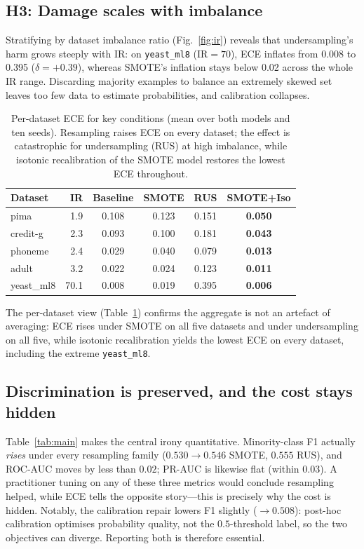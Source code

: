 \documentclass[conference]{IEEEtran}
\begin{document}
\subsection{H3: Damage scales with imbalance}
Stratifying by dataset imbalance ratio (Fig.~\ref{fig:ir}) reveals that
undersampling's harm grows steeply with IR: on \texttt{yeast\_ml8}
(IR$=70$), ECE inflates from 0.008 to 0.395 ($\delta=+0.39$), whereas
SMOTE's inflation stays below 0.02 across the whole IR range. Discarding
majority examples to balance an extremely skewed set leaves too few data
to estimate probabilities, and calibration collapses.

\begin{table}[t]
\caption{Per-dataset ECE for key conditions (mean over both models and
ten seeds). Resampling raises ECE on every dataset; the effect is
catastrophic for undersampling (RUS) at high imbalance, while isotonic
recalibration of the SMOTE model restores the lowest ECE throughout.}
\label{tab:perdata}
\centering
\begin{tabular}{lrcccc}
\toprule
Dataset & IR & Baseline & SMOTE & RUS & SMOTE+Iso \\
\midrule
pima & 1.9 & 0.108 & 0.123 & 0.151 & \textbf{0.050} \\
credit-g & 2.3 & 0.093 & 0.100 & 0.181 & \textbf{0.043} \\
phoneme & 2.4 & 0.029 & 0.040 & 0.079 & \textbf{0.013} \\
adult & 3.2 & 0.022 & 0.024 & 0.123 & \textbf{0.011} \\
yeast\_ml8 & 70.1 & 0.008 & 0.019 & 0.395 & \textbf{0.006} \\
\bottomrule
\end{tabular}
\end{table}

The per-dataset view (Table~\ref{tab:perdata}) confirms the aggregate is
not an artefact of averaging: ECE rises under SMOTE on all five datasets
and under undersampling on all five, while isotonic recalibration yields
the lowest ECE on every dataset, including the extreme
\texttt{yeast\_ml8}.

\subsection{Discrimination is preserved, and the cost stays hidden}
Table~\ref{tab:main} makes the central irony quantitative. Minority-class
F1 actually \emph{rises} under every resampling family
($0.530\to0.546$ SMOTE, $0.555$ RUS), and ROC-AUC moves by less than
$0.02$; PR-AUC is likewise flat (within $0.03$). A practitioner tuning on
any of these three metrics would conclude resampling helped, while ECE
tells the opposite story---this is precisely why the cost is hidden.
Notably, the calibration repair lowers F1 slightly ($\to0.508$): post-hoc
calibration optimises probability quality, not the $0.5$-threshold label,
so the two objectives can diverge. Reporting both is therefore essential.
\end{document}
